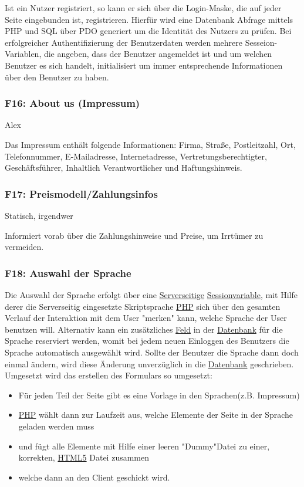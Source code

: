 \documentclass[10pt,a4paper]{scrartcl}
\begin{document}
\bigskip

Ist ein Nutzer registriert, so kann er sich über die Login-Maske, die auf jeder Seite eingebunden ist, registrieren. Hierfür wird eine Datenbank Abfrage mittels PHP und SQL über PDO generiert um die Identität des Nutzers zu prüfen. Bei erfolgreicher Authentifizierung der Benutzerdaten werden mehrere Sesseion-Variablen, die angeben, dass der Benutzer angemeldet ist und um welchen Benutzer es sich handelt, initialisiert um immer entsprechende Informationen über den Benutzer zu haben.

\subsubsection*{F16: About us (Impressum)}

Alex

Das Impressum enthält folgende Informationen: Firma, Straße, Postleitzahl, Ort, Telefonnummer, E-Mailadresse, Internetadresse, Vertretungsberechtigter, \\ Geschäftsführer, Inhaltlich Verantwortlicher und Haftungshinweis. 

\subsubsection*{F17: Preismodell/Zahlungsinfos}

Statisch, irgendwer

Informiert vorab über die Zahlungshinweise und Preise, um Irrtümer zu vermeiden.

\subsubsection*{F18: Auswahl der Sprache}

Die Auswahl der Sprache erfolgt über eine \underline{Serverseitige} \underline{Sessionvariable}, mit Hilfe derer 
die Serverseitig eingesetzte Skriptsprache \underline{PHP} sich über den gesamten Verlauf der Interaktion mit dem User "merken" kann,
welche Sprache der User benutzen will. Alternativ kann ein zusätzliches \underline{Feld} in der \underline{Datenbank} für die 
Sprache reserviert werden, womit bei jedem neuen Einloggen des Benutzers die Sprache automatisch ausgewählt wird. Sollte der Benutzer
die Sprache dann doch einmal ändern, wird diese Änderung unverzüglich in die \underline{Datenbank} geschrieben.
Umgesetzt wird das erstellen des Formulars so umgesetzt:
\begin{itemize}
 \item Für jeden Teil der Seite gibt es eine Vorlage in den Sprachen(z.B. Impressum)
 \item \underline{PHP} wählt dann zur Laufzeit aus, welche Elemente der Seite in der Sprache geladen werden muss
 \item und fügt alle Elemente mit Hilfe einer leeren "Dummy"Datei zu einer, korrekten, \underline{HTML5} Datei zusammen
 \item welche dann an den Client geschickt wird.
\end{itemize}
\end{document}
